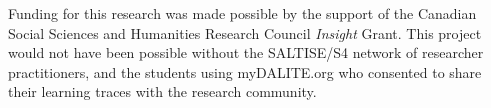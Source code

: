 \documentclass[sigconf]{acmart}
\begin{document}
\begin{acks}
Funding for this research was made possible by the support of the Canadian 
Social Sciences and Humanities Research Council \textit{Insight} Grant. This 
project would not have been possible without the SALTISE/S4 network of 
researcher practitioners, and the students using myDALITE.org who consented to 
share their learning traces with the research community.
\end{acks}



\end{document}
